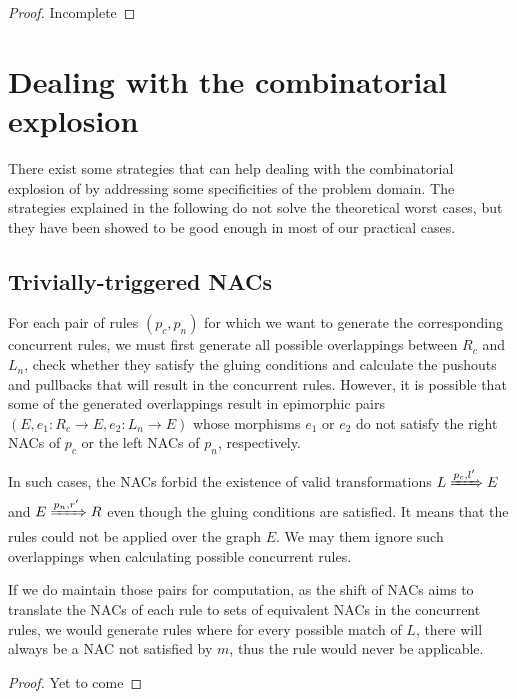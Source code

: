 \begin{thm}[EpiPairs]
  \begin{proof}{Incomplete}
  \end{proof}
\end{thm}

\section{Dealing with the combinatorial explosion}\label{sec:explosion}

There exist some strategies that can help dealing with the combinatorial explosion of by addressing some specificities of the problem domain. The strategies explained in the following do not solve the theoretical worst cases, but they have been showed to be good enough in most of our practical cases.

\subsection{Trivially-triggered NACs}

For each pair of rules $(p_c,p_n)$ for which we want to generate the corresponding concurrent rules, we must first generate all possible overlappings between $R_c$ and $L_n$, check whether they satisfy the gluing conditions and calculate the pushouts and pullbacks that will result in the concurrent rules. However, it is possible that some of the generated overlappings result in epimorphic pairs $(E, e_1 : R_c \rightarrow E, e_2 : L_n \rightarrow E)$ whose morphisms $e_1$ or $e_2$ do not satisfy
the right NACs of $p_c$ or the left NACs of $p_n$, respectively.

In such cases, the NACs forbid the existence of valid transformations \mbox{$L \xRightarrow{p_c,l'} E$} and $E \xRightarrow{p_n,r'} R$ even though the gluing conditions are satisfied. It means that the rules could not be applied over the graph $E$. We may them ignore such overlappings when calculating possible concurrent rules.

If we do maintain those pairs for computation, as the shift of NACs aims to translate the NACs of each rule to sets of equivalent NACs in the concurrent rules, we would generate rules where for every possible match of $L$, there will always be a NAC not satisfied by $m$, thus the rule would never be applicable.

\begin{thm}
  \begin{proof}{Yet to come}
  \end{proof}
\end{thm}

